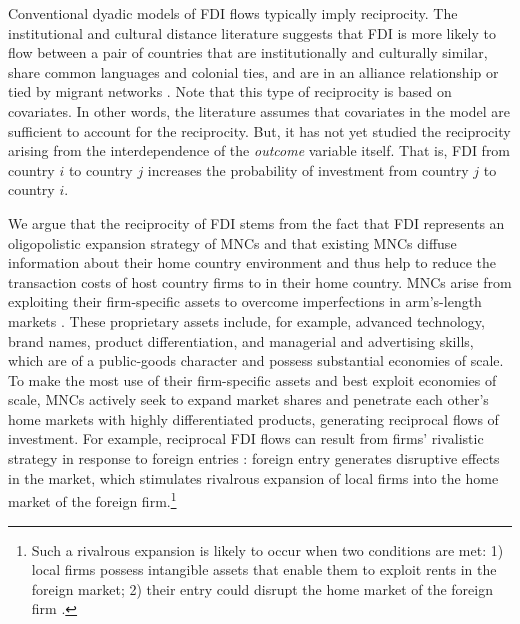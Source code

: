 \documentclass[reqno,onecolumn,letterpaper,12pt]{article}
\begin{document}
Conventional dyadic models of FDI flows typically imply reciprocity. The institutional and cultural distance literature suggests that FDI is more likely to flow between a pair of countries that are institutionally and culturally similar, share common languages and colonial ties, and are in an alliance relationship or tied by migrant networks \citep[e.g.,][]{Eden_Miller:2004,Leblang:2010,Li_Vashchilko:2010,Beazer_Blake:2018}.
Note that this type of reciprocity is based on covariates. In other words, the literature assumes that covariates in the model are sufficient to account for the reciprocity. But, it has not yet studied the reciprocity arising from the interdependence of the \textit{outcome} variable itself. That is, FDI from country $i$ to country $j$ increases the probability of investment from country $j$ to country $i$.

We argue that the reciprocity of FDI stems from the fact that FDI represents an oligopolistic expansion strategy of MNCs \citep{Hymer:1976,Kindleberger:1969} and that existing MNCs diffuse information about their home country environment and thus help to reduce the transaction costs of host country firms to in their home country. MNCs arise from exploiting their firm-specific assets to overcome imperfections in arm's-length markets \citep{Caves:1996,Dunning:1992}. These proprietary assets include, for example, advanced technology, brand names, product differentiation, and managerial and advertising skills, which are of a public-goods character and possess substantial economies of scale. To make the most use of their firm-specific assets and best exploit economies of scale, MNCs actively seek to expand market shares and penetrate each other's home markets with highly differentiated products, generating reciprocal flows of investment. For example, reciprocal FDI flows can result from firms' rivalistic strategy in response to foreign entries \citep{Graham:1978}: foreign entry generates disruptive effects in the market, which stimulates rivalrous expansion of local firms into the home market of the foreign firm.\footnote{Such a rivalrous expansion is likely to occur when two conditions are met: 1) local firms possess intangible assets that enable them to exploit rents in the foreign market; 2) their entry could disrupt the home market of the foreign firm \citep{Graham:1978}.}
\end{document}
